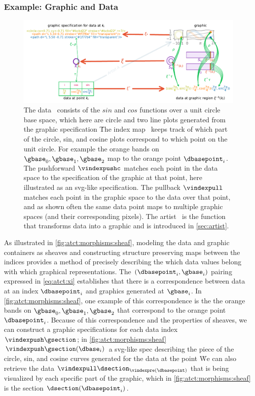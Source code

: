 \documentclass[review]{vgtc}
\theoremstyle{definition}
\theoremstyle{remark}
\begin{document}
\subsubsection{Example: Graphic and Data}
\begin{figure}[t]
  \includegraphics[width=1\textwidth]{xi_diagram.pdf}
  \caption{The data  \dsectionc\ consists of the $sin$ and $cos$ functions over a unit circle base space, which here are circle and two line plots generated from the graphic specification \gsectionc\. The index map \vindexc\ keeps track of which part of the circle, sin, and cosine plots correspond to which point on the unit circle. For example the orange bands on $\gbase_0, \gbase_1, \gbase_2$ map to the orange point $\dbasepoint_i$. The pushforward $\vindexpushc$ matches each point in the data space to the specification of the graphic at that point, here illustrated as an svg-like specification. The pullback $\vindexpull$ matches each point in the graphic space to the data over that point, and as shown often the same data point maps to multiple graphic spaces (and their corresponding pixels). The artist \vartistc\ is the function
  that transforms data into a graphic and is introduced in \autoref{sec:artist}.
  \label{fig:atct:morphisms:sheaf}}
\end{figure}

As illustrated in \autoref{fig:atct:morphisms:sheaf}, modeling the data and graphic containers as sheaves and constructing structure preserving maps between the indices provides a method of precisely describing the which data values belong with which graphical representations. The $(\dbasepoint_i, \gbase_i)$ pairing expressed in \autoref{eq:atct:xi} establishes that there is a correspondence between data at an index $\dbasepoint_i$ and graphics generated at $\gbase_i$. In \autoref{fig:atct:morphisms:sheaf}, one example of this correspondence is the the orange bands on $\gbase_0, \gbase_1, \gbase_2$ that correspond to the orange point $\dbasepoint_i$. Because of this correspondence and the properties of sheaves, we can construct a graphic specifications for each data index $\vindexpush\gsection$; in \autoref{fig:atct:morphisms:sheaf}  $\vindexpush\gsection(\dbase_i)$ a svg-like spec describing the piece of the circle, sin, and cosine curves generated for the data at the point \dbasepointc\. We can also retrieve the data $\vindexpull\dsection_{\vindexpre(\dbasepoint)}$ that is being visualized by each specific part of the graphic, which in \autoref{fig:atct:morphisms:sheaf} is the section $\dsection(\dbasepoint_i)$.
\end{document}
